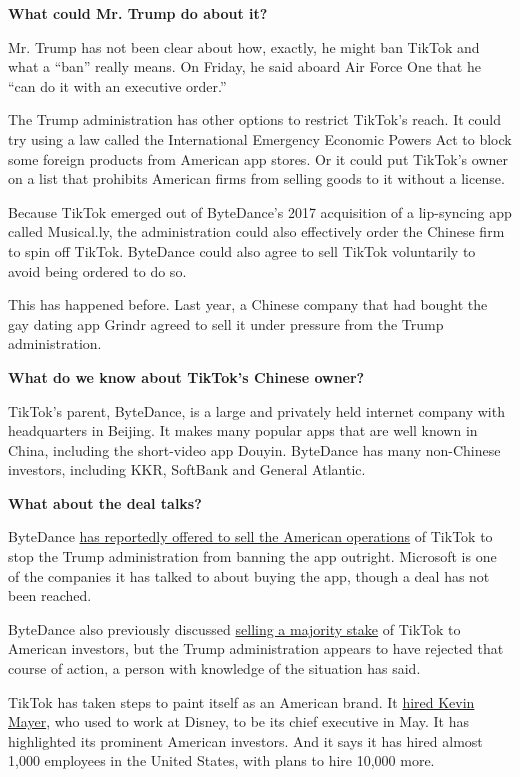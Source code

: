 \textbf{What could Mr. Trump do about it?}

Mr. Trump has not been clear about how, exactly, he might ban TikTok and
what a ``ban'' really means. On Friday, he said aboard Air Force One
that he ``can do it with an executive order.''

The Trump administration has other options to restrict TikTok's reach.
It could try using a law called the International Emergency Economic
Powers Act to block some foreign products from American app stores. Or
it could put TikTok's owner on a list that prohibits American firms from
selling goods to it without a license.

Because TikTok emerged out of ByteDance's 2017 acquisition of a
lip-syncing app called Musical.ly, the administration could also
effectively order the Chinese firm to spin off TikTok. ByteDance could
also agree to sell TikTok voluntarily to avoid being ordered to do so.

This has happened before. Last year, a Chinese company that had bought
the gay dating app Grindr agreed to sell it under pressure from the
Trump administration.

\textbf{What do we know about TikTok's Chinese owner?}

TikTok's parent, ByteDance, is a large and privately held internet
company with headquarters in Beijing. It makes many popular apps that
are well known in China, including the short-video app Douyin. ByteDance
has many non-Chinese investors, including KKR, SoftBank and General
Atlantic.

\textbf{What about the deal talks?}

ByteDance
\href{https://www.nytimes.com/2020/08/01/technology/tiktok-sale-trump-ban.html}{has
reportedly offered to sell the American operations} of TikTok to stop
the Trump administration from banning the app outright. Microsoft is one
of the companies it has talked to about buying the app, though a deal
has not been reached.

ByteDance also previously discussed
\href{https://www.nytimes.com/2020/07/23/business/dealbook/tiktok-bytedance-investors-trump.html?searchResultPosition=2}{selling
a majority stake} of TikTok to American investors, but the Trump
administration appears to have rejected that course of action, a person
with knowledge of the situation has said.

TikTok has taken steps to paint itself as an American brand. It
\href{https://www.nytimes.com/2020/05/18/business/media/tiktok-ceo-kevin-mayer.html}{hired
Kevin Mayer}, who used to work at Disney, to be its chief executive in
May. It has highlighted its prominent American investors. And it says it
has hired almost 1,000 employees in the United States, with plans to
hire 10,000 more.

